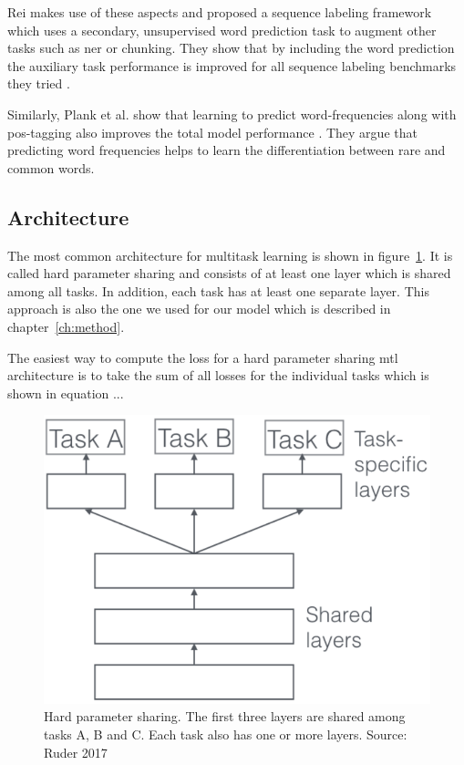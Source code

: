 Rei makes use of these aspects and proposed a sequence labeling framework which uses a secondary, unsupervised word prediction task to augment other tasks such as \gls{ner} or chunking. They show that by including the word prediction the auxiliary task performance is improved for all sequence labeling benchmarks they tried \cite{Rei2017}.

Similarly, Plank et al. show that learning to predict word-frequencies along with \gls{pos}-tagging also improves the total model performance \cite{Plank}. They argue that predicting word frequencies helps to learn the differentiation between rare and common words.


\subsection{Architecture}
The most common architecture for multitask learning is shown in figure~\ref{fig:03_mtl_architecture}. It is called hard parameter sharing and consists of at least one layer which is shared among all tasks. In addition, each task has at least one separate layer. This approach is also the one we used for our model which is described in chapter~\ref{ch:method}. 

The easiest way to compute the loss for a hard parameter sharing \gls{mtl} architecture is to take the sum of all losses for the individual tasks which is shown in equation ...


\begin{figure}[ht]
	\centering
	\includegraphics[scale=0.5]{figures/03_theory/03_mtl_architecture}
	\caption{Hard parameter sharing. The first three layers are shared among tasks A, B and C. Each task also has one or more layers. Source: Ruder 2017 \cite{Ruder2017}}
	\label{fig:03_mtl_architecture}
\end{figure}



